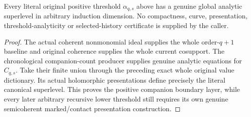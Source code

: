 \begin{theorem}
\label{hir:original-positive-canonical-companion-count-global-analytic-producer}
\leanok
{}
Every literal original positive threshold $\alpha_{q,s}$ above has a genuine
global analytic superlevel in arbitrary induction dimension. No compactness,
curve, presentation, threshold-analyticity or selected-history certificate
is supplied by the caller.
\end{theorem}
\begin{proof}
The actual coherent nonmonomial ideal supplies the whole order-$q+1$ baseline
and original coherence supplies the whole current cosupport. The chronological
companion-count producer supplies genuine analytic equations for $C_{q,s}$.
Take their finite union through the preceding exact whole original value
dictionary. Its actual holomorphic presentations define precisely the
literal canonical superlevel. This proves the positive companion boundary
layer, while every later arbitrary recursive lower threshold still requires
its own genuine semicoherent marked/contact presentation construction.
\end{proof}
